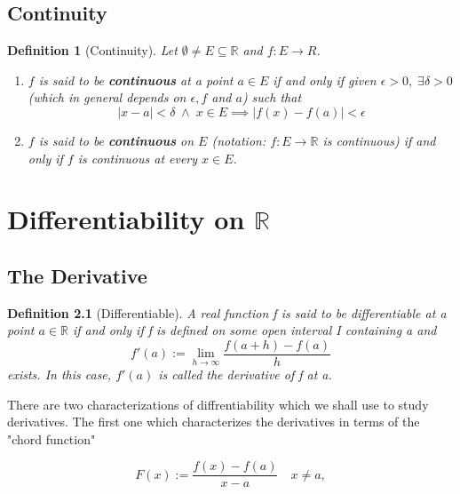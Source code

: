 \documentclass[11pt, oneside]{book}
\theoremstyle{break}
\newtheorem{defn}{Definition}[section]
\newcommand{\bb}[1]{\mathbb{#1}}			%
\begin{document}
\section{Continuity}\label{sect:Continuity}

\begin{defn}[Continuity]\label{defn:Continuity}
    Let $\emptyset \neq E \subseteq \bb{R}$ and $f: E \to R$.
    \begin{enumerate}
        \item $f$ is said to be \textbf{continuous} at a point $a \in E$ if and only if given $\epsilon > 0, \; \exists \delta > 0$ (which in general depends on $\epsilon, f$ and $a$) such that
            \begin{equation}
                |x - a| < \delta \; \land \; x \in E \implies |f(x) - f(a)| < \epsilon
            \end{equation}
        \item $f$ is said to be \textbf{continuous} on $E$ (notation: $f: E \to \bb{R}$ is continuous) if and only if $f$ is continuous at every $x \in E$.
    \end{enumerate}
\end{defn}

\chapter{Differentiability on \texorpdfstring{$\bb{R}$}{R}}

\section{The Derivative}

\begin{defn}[Differentiable]\label{defn:Differentiable}
    A real function f is said to be differentiable at a point $a \in \bb{R}$ if and only if f is defined on some open interval I containing a and
    \begin{equation}\label{eq:differentation defn}
        f'(a) := \lim_{h \to \infty} \frac{f(a+h) - f(a)}{h}
    \end{equation}
    exists. In this case, $f'(a)$ is called the derivative of f at a.
\end{defn}

There are two characterizations of diffrentiability which we shall use to study derivatives. The first one which characterizes the derivatives in terms of the "chord function"

\begin{equation}\label{eq:equiv differentiation defn}
    F(x) := \frac{f(x) - f(a)}{x-a} \quad x \neq a,
\end{equation}
\end{document}
